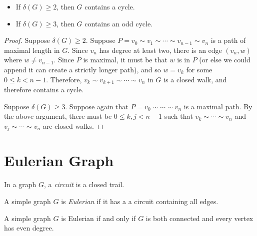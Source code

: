 \begin{prop}\proofbreak
    \begin{itemize}
        \item If $\delta(G) \geq 2$, then $G$ contains a cycle.
        \item If $\delta(G) \geq 3$, then $G$ contains an odd cycle.
    \end{itemize}
\end{prop}

\begin{proof}
    Suppose $\delta(G) \geq 2$. Suppose $P = v_0 \sim v_1 \sim \cdots \sim v_{n-1} \sim v_n$ is a path of maximal length in $G$. Since $v_n$ has degree at least two, there is an edge $(v_n, w)$ where $w \neq v_{n-1}$. Since $P$ is maximal, it must be that $w$ is in $P$ (or else we could append it can create a strictly longer path), and so $w = v_k$ for some $0 \leq k < n-1$. Therefore, $v_k \sim v_{k+1} \sim \cdots \sim v_n$ in $G$ is a closed walk, and therefore contains a cycle.

    Suppose $\delta(G) \geq 3$. Suppose again that $P = v_0 \sim \cdots \sim v_n$ is a maximal path. By the above argument, there must be $0 \leq k, j < n-1$ such that $v_k \sim \cdots \sim v_n$ and $v_j \sim \cdots \sim v_n$ are closed walks.
\end{proof}

\section{Eulerian Graph}

\begin{defn}
    In a graph $G$, a \emph{circuit} is a closed trail.
\end{defn}

\begin{defn}
    A simple graph $G$ is \emph{Eulerian} if it has a a circuit containing all edges.
\end{defn}

\begin{thm}
    A simple graph $G$ is Eulerian if and only if $G$ is both connected and every vertex has even degree.
\end{thm}

